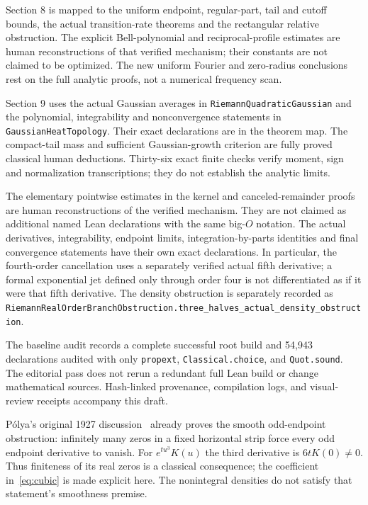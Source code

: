 \documentclass[11pt]{article}
\theoremstyle{remark}\newtheorem{remark}[theorem]{Remark}
\newcommand{\code}[1]{{\small\nolinkurl{#1}}}
\begin{document}
Section 8 is mapped to the uniform endpoint, regular-part,
tail and cutoff bounds, the actual transition-rate theorems and
the rectangular relative obstruction. The explicit Bell-polynomial
and reciprocal-profile estimates are human reconstructions of that
verified mechanism; their constants are not claimed to be optimized.
The new uniform Fourier and zero-radius conclusions rest on the full
analytic proofs, not a numerical frequency scan.

Section 9 uses the actual Gaussian averages in \code{RiemannQuadraticGaussian} and the polynomial, integrability and nonconvergence statements in \code{GaussianHeatTopology}. Their exact declarations are in the theorem map. The compact-tail mass and sufficient Gaussian-growth criterion are fully proved classical human deductions. Thirty-six exact finite checks verify moment, sign and normalization transcriptions; they do not establish the analytic limits.

The elementary pointwise estimates in the kernel and canceled-remainder
proofs are human reconstructions of the verified mechanism. They
are not claimed as additional named Lean declarations with the same
big-$O$ notation. The actual derivatives, integrability, endpoint
limits, integration-by-parts identities and final convergence
statements have their own exact declarations. In particular, the
fourth-order cancellation uses a separately verified actual fifth
derivative; a formal exponential jet defined only through order four
is not differentiated as if it were that fifth derivative.
The density obstruction is separately recorded as
\code{RiemannRealOrderBranchObstruction.three_halves_actual_density_obstruction}.

The baseline audit records a complete successful root build and
54,943 declarations audited with only \code{propext},
\code{Classical.choice}, and \code{Quot.sound}. The editorial pass
does not rerun a redundant full Lean build or change mathematical
sources. Hash-linked provenance, compilation logs, and visual-review
receipts accompany this draft.

P\'olya's original 1927 discussion~\cite[Chapter I, no. 6,
assertion II, pp. 14--15]{polyaJensen} already proves the smooth
odd-endpoint obstruction: infinitely many zeros in a fixed horizontal
strip force every odd endpoint derivative to vanish. For
$e^{tu^3}K(u)$ the third derivative is $6tK(0)\neq0$.
Thus finiteness of its real zeros is a classical consequence; the
coefficient in~\eqref{eq:cubic} is made explicit here. The nonintegral
densities do not satisfy that statement's smoothness premise.
\end{document}
